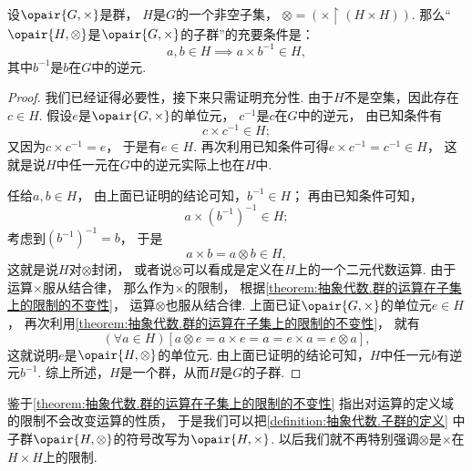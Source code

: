 \begin{theorem}
设\(\opair{G,\times}\)是群，
\(H\)是\(G\)的一个非空子集，
\(\otimes = (\times \upharpoonright(H \times H))\).
那么“\(\opair{H,\otimes}\)是\(\opair{G,\times}\)的子群”的充要条件是：\[
	a,b \in H \implies a \times b^{-1} \in H,
\]
其中\(b^{-1}\)是\(b\)在\(G\)中的逆元.
\begin{proof}
我们已经证得必要性，接下来只需证明充分性.
由于\(H\)不是空集，因此存在\(c \in H\).
假设\(e\)是\(\opair{G,\times}\)的单位元，
\(c^{-1}\)是\(c\)在\(G\)中的逆元，
由已知条件有\[
	c \times c^{-1} \in H;
\]
又因为\(c \times c^{-1} = e\)，
于是有\(e \in H\).
再次利用已知条件可得\(e \times c^{-1} = c^{-1} \in H\)，
这就是说\(H\)中任一元在\(G\)中的逆元实际上也在\(H\)中.

任给\(a,b \in H\)，
由上面已证明的结论可知，\(b^{-1} \in H\)；
再由已知条件可知，\[
	a \times (b^{-1})^{-1} \in H;
\]
考虑到\((b^{-1})^{-1} = b\)，
于是\[
	a \times b = a \otimes b \in H,
\]
这就是说\(H\)对\(\otimes\)封闭，
或者说\(\otimes\)可以看成是定义在\(H\)上的一个二元代数运算.
由于运算\(\times\)服从结合律，
那么作为\(\times\)的限制，
根据\cref{theorem:抽象代数.群的运算在子集上的限制的不变性}，
运算\(\otimes\)也服从结合律.
上面已证\(\opair{G,\times}\)的单位元\(e \in H\)，
再次利用\cref{theorem:抽象代数.群的运算在子集上的限制的不变性}，
就有\[
	(\forall a \in H)[
		a \otimes e = a \times e = a = e \times a = e \otimes a
	],
\]
这就说明\(e\)是\(\opair{H,\otimes}\)的单位元.
由上面已证明的结论可知，\(H\)中任一元\(b\)有逆元\(b^{-1}\).
综上所述，\(H\)是一个群，从而\(H\)是\(G\)的子群.
\end{proof}
\end{theorem}

鉴于\cref{theorem:抽象代数.群的运算在子集上的限制的不变性}
指出对运算的定义域的限制不会改变运算的性质，
于是我们可以把\cref{definition:抽象代数.子群的定义} 中%
子群\(\opair{H,\otimes}\)的符号改写为\(\opair{H,\times}\).
以后我们就不再特别强调\(\otimes\)是\(\times\)在\(H\times H\)上的限制.

